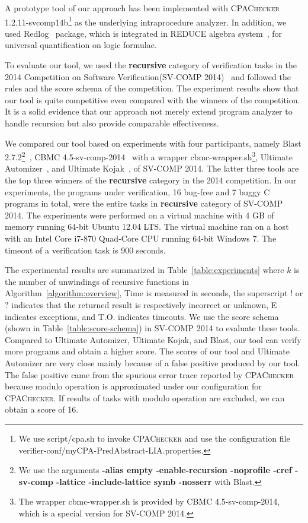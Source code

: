 \newcommand{\safe}{S}
\newcommand{\unsafe}{U}
\newcommand{\unknown}{?}
\newcommand{\exception}{E}
\newcommand{\timeout}{T.O.}
\newcommand{\unknownmark}{\ensuremath{^?}}
\newcommand{\wrongmark}{\ensuremath{^!}}

A prototype tool of our approach has been implemented with
\textsc{CPAChecker} 1.2.11-svcomp14b\footnote{We use script/cpa.sh to
  invoke \textsc{CPAChecker} and use the configuration file
  verifier-conf/myCPA-PredAbstract-LIA.properties.} as the underlying
intraprocedure analyzer.
In addition, we used Redlog~\cite{} package, which is integrated in REDUCE
algebra system~\cite{}, for universal quantification on logic formulae.

To evaluate our tool, we used the \textbf{recursive} category of verification 
tasks in the 2014 Competition on Software Verification(SV-COMP 2014)~\cite
{svcomp14} and followed the rules and the score schema of the competition.
The experiment results show that our tool is quite competitive even compared 
with the winners of the competition. It is a solid evidence that our approach 
not merely extend program analyzer to handle recursion but also provide 
comparable effectiveness.

We compared our tool based on experiments with four participants,
namely Blast 2.7.2\footnote{We use the arguments \textbf{-alias empty
    -enable-recursion -noprofile -cref -sv-comp -lattice
    -include-lattice symb -nosserr} with Blast.}~\cite{BeyerHJM07},
CBMC 4.5-sv-comp-2014~\cite{ClarkeKL04} with a wrapper
cbmc-wrapper.sh\footnote{The wrapper cbmc-wrapper.sh is provided by
  CBMC 4.5-sv-comp-2014, which is a special version for SV-COMP
  2014.}, Ultimate Automizer~\cite{HeizmannCDEHLNSP13}, and Ultimate
Kojak~\cite{Kojak}, of SV-COMP 2014.
The latter three tools are the top three winners of the
\textbf{recursive} category in the 2014 competition.
In our experiments, the programs under verification, 16 bug-free and 
7 buggy C programs in total, were the entire tasks in \textbf{recursive}
category of SV-COMP 2014.
The experiments were performed on a virtual machine with 4 GB of memory
running 64-bit Ubuntu 12.04 LTS. 
The virtual machine ran on a host with an Intel Core i7-870 Quad-Core
CPU running 64-bit Windows 7.
The timeout of a verification task is 900 seconds.

The experimental results are summarized in
Table~\ref{table:experiments} where $k$ is the number of unwindings of
recursive functions in Algorithm~\ref{algorithm:overview}, Time is
measured in seconds, the superscript $!$ or $?$ indicates that the
returned result is respectively incorrect or unknown, E indicates
exceptions, and T.O. indicates timeouts.
We use the score schema (shown in Table~\ref{table:score-schema}) in
SV-COMP 2014 to evaluate these tools.
Compared to Ultimate Automizer, Ultimate Kojak, and Blast, our tool
can verify more programs and obtain a higher score.
The scores of our tool and Ultimate Automizer are very close mainly
because of a false positive produced by our tool.
The false positive came from the spurious error trace reported by
\textsc{CPAChecker} because modulo operation is approximated under our 
configuration for \textsc{CPAChecker}. If results of tasks with modulo
operation are excluded, we can obtain a score of 16.


